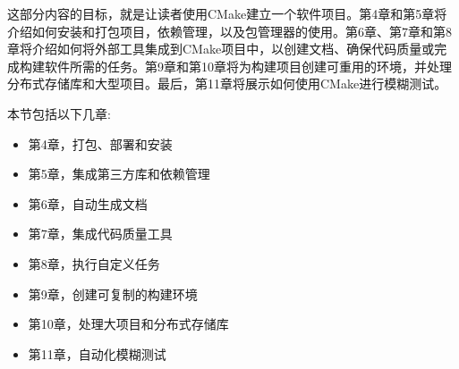 这部分内容的目标，就是让读者使用CMake建立一个软件项目。第4章和第5章将介绍如何安装和打包项目，依赖管理，以及包管理器的使用。第6章、第7章和第8章将介绍如何将外部工具集成到CMake项目中，以创建文档、确保代码质量或完成构建软件所需的任务。第9章和第10章将为构建项目创建可重用的环境，并处理分布式存储库和大型项目。最后，第11章将展示如何使用CMake进行模糊测试。

本节包括以下几章:

\begin{itemize}
\item 第4章，打包、部署和安装
\item 第5章，集成第三方库和依赖管理
\item 第6章，自动生成文档
\item 第7章，集成代码质量工具
\item 第8章，执行自定义任务
\item 第9章，创建可复制的构建环境
\item 第10章，处理大项目和分布式存储库
\item 第11章，自动化模糊测试
\end{itemize}